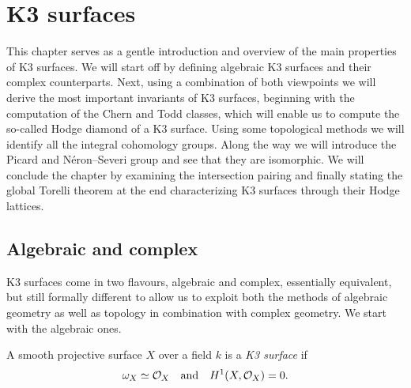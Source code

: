 \section{K3 surfaces}
\label{Chapter: K3}

This chapter serves as a gentle introduction and overview of the main properties of K3 surfaces. We will start off by defining algebraic K3 surfaces and their complex counterparts. Next, using a combination of both viewpoints we will derive the most important invariants of K3 surfaces, beginning with the computation of the Chern and Todd classes, which will enable us to compute the so-called Hodge diamond of a K3 surface. Using some topological methods we will identify all the integral cohomology groups. Along the way we will introduce the Picard and Néron--Severi group and see that they are isomorphic. We will conclude the chapter by examining the intersection pairing and finally stating the global Torelli theorem at the end characterizing K3 surfaces through their Hodge lattices. 


\subsection{Algebraic and complex}

K3 surfaces come in two flavours, algebraic and complex, essentially equivalent, but still formally different to allow us to exploit both the methods of algebraic geometry as well as topology in combination with complex geometry. We start with the algebraic ones.

\begin{definition}
    A smooth projective surface $X$ over a field $k$ is a \emph{K3 surface} if 
    \[
        \omega_X \simeq {\mathcal{O}_{X}} \quad \text{and} \quad H^{1}(X, {\mathcal{O}_{X}}) = 0.
    \]
\end{definition}

